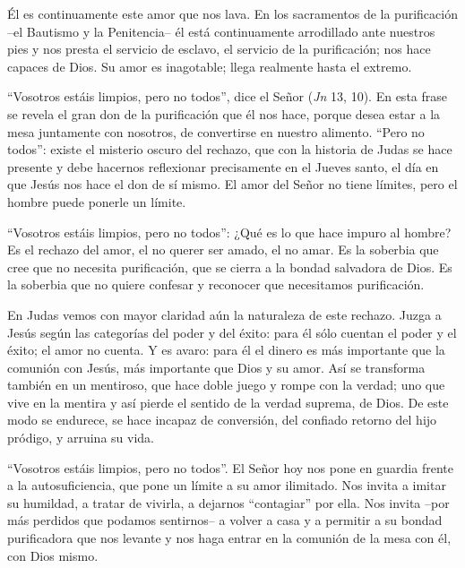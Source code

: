 			\begin{body}Él es continuamente este amor que nos lava. En los sacramentos de la purificación –el Bautismo y la Penitencia– él está continuamente arrodillado ante nuestros pies y nos presta el servicio de esclavo, el servicio de la purificación; nos hace capaces de Dios. Su amor es inagotable; llega realmente hasta el extremo.\end{body}
			
			\begin{body}“Vosotros estáis limpios, pero no todos”, dice el Señor (\textit{Jn} 13, 10). En esta frase se revela el gran don de la purificación que él nos hace, porque desea estar a la mesa juntamente con nosotros, de convertirse en nuestro alimento. “Pero no todos”: existe el misterio oscuro del rechazo, que con la historia de Judas se hace presente y debe hacernos reflexionar precisamente en el Jueves santo, el día en que Jesús nos hace el don de sí mismo. El amor del Señor no tiene límites, pero el hombre puede ponerle un límite.\end{body}
			
			\begin{body}“Vosotros estáis limpios, pero no todos”: ¿Qué es lo que hace impuro al hombre? Es el rechazo del amor, el no querer ser amado, el no amar. Es la soberbia que cree que no necesita purificación, que se cierra a la bondad salvadora de Dios. Es la soberbia que no quiere confesar y reconocer que necesitamos purificación.\end{body}
			
			\begin{body}En Judas vemos con mayor claridad aún la naturaleza de este rechazo. Juzga a Jesús según las categorías del poder y del éxito: para él sólo cuentan el poder y el éxito; el amor no cuenta. Y es avaro: para él el dinero es más importante que la comunión con Jesús, más importante que Dios y su amor. Así se transforma también en un mentiroso, que hace doble juego y rompe con la verdad; uno que vive en la mentira y así pierde el sentido de la verdad suprema, de Dios. De este modo se endurece, se hace incapaz de conversión, del confiado retorno del hijo pródigo, y arruina su vida.\end{body}
			
			\begin{body}“Vosotros estáis limpios, pero no todos”. El Señor hoy nos pone en guardia frente a la autosuficiencia, que pone un límite a su amor ilimitado. Nos invita a imitar su humildad, a tratar de vivirla, a dejarnos “contagiar” por ella. Nos invita –por más perdidos que podamos sentirnos– a volver a casa y a permitir a su bondad purificadora que nos levante y nos haga entrar en la comunión de la mesa con él, con Dios mismo.\end{body}
			
